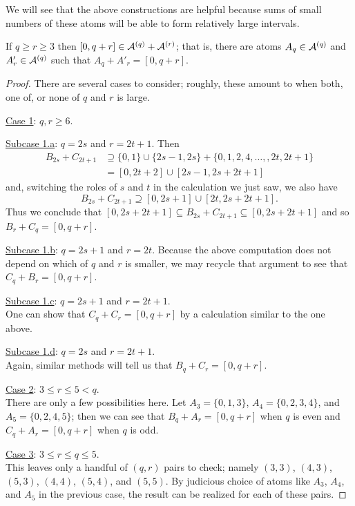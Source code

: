 We will see that the above constructions are helpful because sums of small numbers of these atoms will be able to form relatively large intervals.

\begin{lemma} \label{lem:two-part types}
	If $q\ge r \ge 3$ then $[ 0, q+r ] \in \mathcal{A}^{(q)} + \mathcal{A}^{(r)}$; 
	that is, there are atoms $A_q\in \mathcal{A}^{(q)}$ and $A'_r\in \mathcal{A}^{(q)}$ such that $A_q + A'_r = [ 0,q+r ]$.
\end{lemma}

\begin{proof}
	There are several cases to consider; roughly, these amount to when both, one of, or none of $q$ and $r$ is large.
	
	\underline{Case 1}: $q,r \ge 6$. 
	
	\underline{Subcase 1.a}: $q = 2s$ and $r = 2t+1$.
	Then 
	\begin{align*}
	B_{2s} + C_{2t+1} 
	&\supseteq \{0,1\}\cup\{2s-1,2s\} + \{0,1,2,4,\dots, ,2t,2t+1\} \\
	&= [ 0, 2t+2 ] \cup [ 2s-1,2s+2t+1 ]
	\end{align*}
	and, switching the roles of $s$ and $t$ in the calculation we just saw, we also have 
	\[B_{2s}+C_{2t+1} \supseteq [ 0,2s+1 ] \cup [ 2t,2s+2t+1 ].\]
	Thus we conclude that $[ 0,2s+2t+1 ] \subseteq B_{2s}+C_{2t+1} \subseteq [ 0,2s+2t+1 ]$ and so $B_r + C_q = [ 0,q+r ]$.
	
	\underline{Subcase 1.b}: $q = 2s+1$ and $r = 2t$.
	Because the above computation does not depend on which of $q$ and $r$ is smaller, we may recycle that argument to see that $C_q + B_r = [ 0,q+r ]$.
	
	\underline{Subcase 1.c}: $q = 2s+1$ and $r = 2t+1$.\\
	One can show that $C_q + C_r = [ 0,q+r ]$ by a calculation similar to the one above.
	
	\underline{Subcase 1.d}: $q = 2s$ and $r = 2t+1$. \\
	Again, similar methods will tell us that $B_q + C_r = [ 0,q+r ]$.
	
	\underline{Case 2}: $3 \le r \le 5 < q$.\\
	There are only a few possibilities here.
	Let $A_3 = \{0,1,3\}$, $A_4 = \{0,2,3,4\}$, and $A_5 = \{0,2,4,5\}$; then we can see that $B_q +A_r = [ 0,q+r ]$ when $q$ is even and $C_q + A_r = [ 0,q+r ]$ when $q$ is odd.
	
	\underline{Case 3}: $3\le r\le q \le 5$.\\
	This leaves only a handful of $(q,r)$ pairs to check; namely $(3,3)$, $(4,3)$, $(5,3)$, $(4,4)$, $(5,4)$, and $(5,5)$.
	By judicious choice of atoms like $A_3$, $A_4$, and $A_5$ in the previous case, the result can be realized for each of these pairs.
\end{proof}

